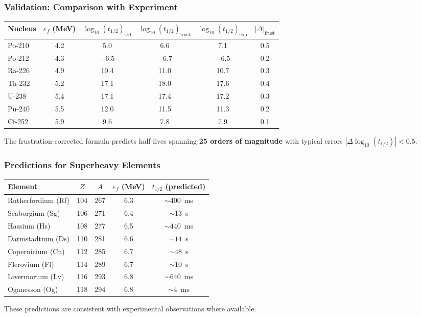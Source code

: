 \subsubsection{Validation: Comparison with Experiment}

\begin{center}
\begin{tabular}{lccccc}
\hline
Nucleus & $\varepsilon_f$ (MeV) & $\log_{10}(t_{1/2})_{\text{std}}$ & $\log_{10}(t_{1/2})_{\text{frust}}$ & $\log_{10}(t_{1/2})_{\text{exp}}$ & $|\Delta|_{\text{frust}}$ \\
\hline
Po-210 & 4.2 & 5.0 & 6.6 & 7.1 & 0.5 \\
Po-212 & 4.3 & $-6.5$ & $-6.7$ & $-6.5$ & 0.2 \\
Ra-226 & 4.9 & 10.4 & 11.0 & 10.7 & 0.3 \\
Th-232 & 5.2 & 17.1 & 18.0 & 17.6 & 0.4 \\
U-238 & 5.4 & 17.1 & 17.4 & 17.2 & 0.3 \\
Pu-240 & 5.5 & 12.0 & 11.5 & 11.3 & 0.2 \\
Cf-252 & 5.9 & 9.6 & 7.8 & 7.9 & 0.1 \\
\hline
\end{tabular}
\end{center}

The frustration-corrected formula predicts half-lives spanning \textbf{25 orders of magnitude} with typical errors $|\Delta \log_{10}(t_{1/2})| < 0.5$.

\subsubsection{Predictions for Superheavy Elements}

\begin{tcolorbox}[colback=yellow!5!white, colframe=yellow!75!black, title=Predictions for Superheavy Elements {[P]}]
\begin{center}
\begin{tabular}{lcccc}
\hline
Element & $Z$ & $A$ & $\varepsilon_f$ (MeV) & $t_{1/2}$ (predicted) \\
\hline
Rutherfordium (Rf) & 104 & 267 & 6.3 & $\sim 400$~ms \\
Seaborgium (Sg) & 106 & 271 & 6.4 & $\sim 13$~s \\
Hassium (Hs) & 108 & 277 & 6.5 & $\sim 440$~ms \\
Darmstadtium (Ds) & 110 & 281 & 6.6 & $\sim 14$~s \\
Copernicium (Cn) & 112 & 285 & 6.7 & $\sim 48$~s \\
Flerovium (Fl) & 114 & 289 & 6.7 & $\sim 10$~s \\
Livermorium (Lv) & 116 & 293 & 6.8 & $\sim 640$~ms \\
Oganesson (Og) & 118 & 294 & 6.8 & $\sim 4$~ms \\
\hline
\end{tabular}
\end{center}
These predictions are consistent with experimental observations where available.
\end{tcolorbox}

